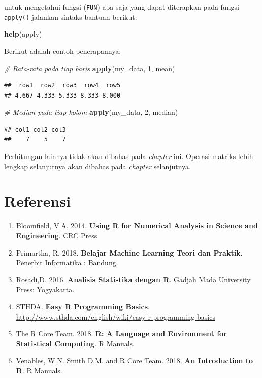 \documentclass[]{book}
\newenvironment{Shaded}{\begin{snugshade}}{\end{snugshade}}
\newcommand{\CommentTok}[1]{\textcolor[rgb]{0.56,0.35,0.01}{\textit{#1}}}
\newcommand{\DecValTok}[1]{\textcolor[rgb]{0.00,0.00,0.81}{#1}}
\newcommand{\KeywordTok}[1]{\textcolor[rgb]{0.13,0.29,0.53}{\textbf{#1}}}
\newcommand{\NormalTok}[1]{#1}
\providecommand{\tightlist}{%
  \setlength{\itemsep}{0pt}\setlength{\parskip}{0pt}}
\theoremstyle{definition}
\theoremstyle{definition}
\theoremstyle{definition}
\theoremstyle{remark}
\begin{document}
untuk mengetahui fungsi (\texttt{FUN}) apa saja yang dapat diterapkan pada fungsi \texttt{apply()} jalankan sintaks bantuan berikut:

\begin{Shaded}
\begin{Highlighting}[]
\KeywordTok{help}\NormalTok{(apply)}
\end{Highlighting}
\end{Shaded}

Berikut adalah contoh penerapannya:

\begin{Shaded}
\begin{Highlighting}[]
\CommentTok{# Rata-rata pada tiap baris}
\KeywordTok{apply}\NormalTok{(my_data, }\DecValTok{1}\NormalTok{, mean)}
\end{Highlighting}
\end{Shaded}

\begin{verbatim}
##  row1  row2  row3  row4  row5 
## 4.667 4.333 5.333 8.333 8.000
\end{verbatim}

\begin{Shaded}
\begin{Highlighting}[]
\CommentTok{# Median pada tiap kolom}
\KeywordTok{apply}\NormalTok{(my_data, }\DecValTok{2}\NormalTok{, median)}
\end{Highlighting}
\end{Shaded}

\begin{verbatim}
## col1 col2 col3 
##    7    5    7
\end{verbatim}

Perhitungan lainnya tidak akan dibahas pada \emph{chapter} ini. Operasi matriks lebih lengkap selanjutnya akan dibahas pada \emph{chapter} selanjutnya.

\hypertarget{referensi-1}{%
\section{Referensi}\label{referensi-1}}

\begin{enumerate}
\def\labelenumi{\arabic{enumi}.}
\tightlist
\item
  Bloomfield, V.A. 2014. \textbf{Using R for Numerical Analysis in Science and Engineering}. CRC Press
\item
  Primartha, R. 2018. \textbf{Belajar Machine Learning Teori dan Praktik}. Penerbit Informatika : Bandung.
\item
  Rosadi,D. 2016. \textbf{Analisis Statistika dengan R}. Gadjah Mada University Press: Yogyakarta.
\item
  STHDA. \textbf{Easy R Programming Basics}. \url{http://www.sthda.com/english/wiki/easy-r-programming-basics}
\item
  The R Core Team. 2018. \textbf{R: A Language and Environment for Statistical Computing}. R Manuals.
\item
  Venables, W.N. Smith D.M. and R Core Team. 2018. \textbf{An Introduction to R}. R Manuals.
\end{enumerate}
\end{document}
